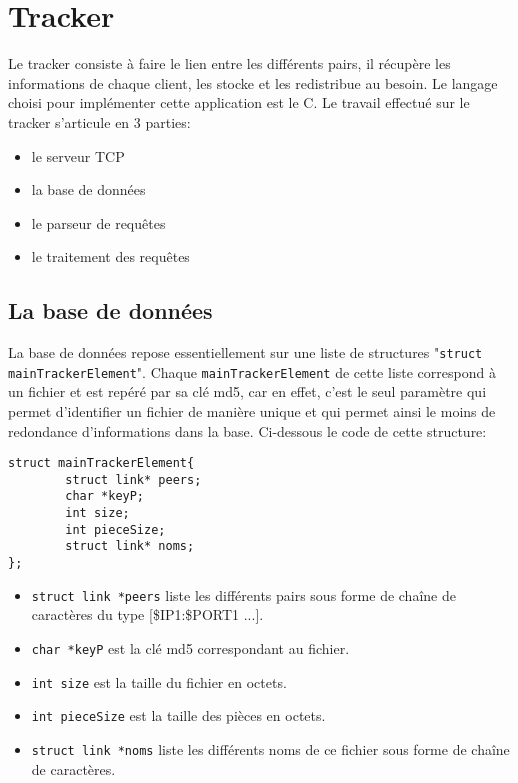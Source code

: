 \section{Tracker}
Le tracker consiste à faire le lien entre les différents pairs, il récupère les informations de chaque client, les stocke et les redistribue au besoin. Le langage choisi pour implémenter cette application est le C. Le travail effectué sur le tracker s'articule en 3 parties:

\begin{itemize}
\item le serveur TCP
\item la base de données
\item le parseur de requêtes
\item le traitement des requêtes
\end{itemize}

\subsection{La base de données}
La base de données repose essentiellement sur une liste de structures "\texttt{struct mainTrackerElement}". Chaque \texttt{mainTrackerElement} de cette liste correspond à un fichier et est repéré par sa clé md5, car en effet, c'est le seul paramètre qui permet d'identifier un fichier de manière unique et qui permet ainsi le moins de redondance d'informations dans la base. Ci-dessous le code de cette structure:

\begin{verbatim}
struct mainTrackerElement{
        struct link* peers;
        char *keyP;
        int size;
        int pieceSize;
        struct link* noms;
};
\end{verbatim}

\begin{itemize}
\item \texttt{struct link *peers} liste les différents pairs sous forme de chaîne de caractères du type [\$IP1:\$PORT1 ...].
\item \texttt{char *keyP} est la clé md5 correspondant au fichier.
\item \texttt{int size} est la taille du fichier en octets.
\item \texttt{int pieceSize} est la taille des pièces en octets.
\item \texttt{struct link *noms} liste les différents noms de ce fichier sous forme de chaîne de caractères.
\end{itemize}

